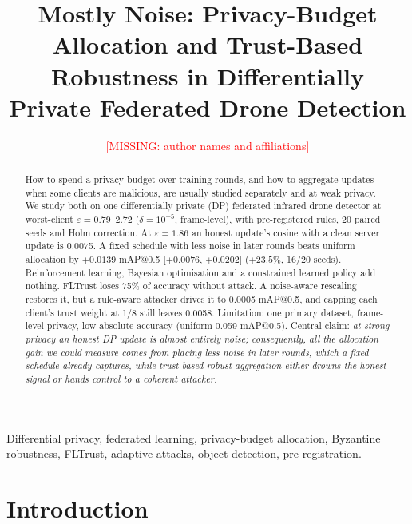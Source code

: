 \documentclass[journal]{IEEEtran}
\makeatletter
\newcommand{\missing}[1]{\textcolor{red}{[MISSING: #1]}}
\newcommand{\eps}{\varepsilon}
\newcommand{\mAP}{mAP@0.5}
\makeatother
\begin{document}
\title{Mostly Noise: Privacy-Budget Allocation and Trust-Based Robustness in Differentially Private Federated Drone Detection}

\author{\missing{author names and affiliations}}


\maketitle

\begin{abstract}
How to spend a privacy budget over training rounds, and how to aggregate updates when some clients
are malicious, are usually studied separately and at weak privacy. We study both on one
differentially private (DP) federated infrared drone detector at worst-client $\eps = 0.79$--$2.72$
($\delta=10^{-5}$, frame-level), with pre-registered rules, 20 paired seeds and Holm correction. At
$\eps = 1.86$ an honest update's cosine with a clean server update is 0.0075. A fixed schedule with
less noise in later rounds beats uniform allocation by $+0.0139$ \mAP{} [$+0.0076$, $+0.0202$]
($+23.5\%$, 16/20 seeds). Reinforcement learning, Bayesian optimisation and a constrained learned
policy add nothing. FLTrust loses 75\% of accuracy without attack. A noise-aware rescaling restores
it, but a rule-aware attacker drives it to 0.0005 \mAP{}, and capping each client's trust weight at
1/8 still leaves 0.0058. Limitation: one primary dataset, frame-level privacy, low absolute accuracy
(uniform 0.059 \mAP). Central claim: \emph{at strong privacy an honest DP update is almost entirely noise; consequently, all the
allocation gain we could measure comes from placing less noise in later rounds, which a fixed
schedule already captures, while trust-based robust aggregation either drowns the honest signal or
hands control to a coherent attacker.}
\end{abstract}

\begin{IEEEkeywords}
Differential privacy, federated learning, privacy-budget allocation, Byzantine robustness, FLTrust,
adaptive attacks, object detection, pre-registration.
\end{IEEEkeywords}

\section{Introduction}
\label{sec:intro}
\end{document}
